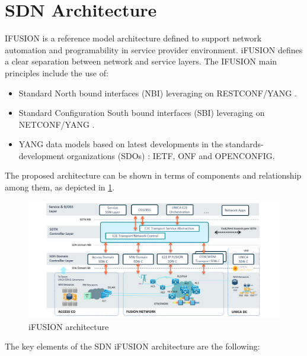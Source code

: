 \documentclass[a4paper,fleqn]{cas-dc}
\begin{document}
\section{SDN Architecture}
\label{section:arq}

\uppercase{iFUSION} is a reference model architecture defined to support network automation and programability in service provider environment. iFUSION defines a clear separation between network and service layers.  The \uppercase{iFUSION} main principles include the use of:
\begin{itemize}
    \item Standard North bound interfaces (NBI) leveraging on \uppercase{RESTconf/YANG} \cite{bierman2017restconf}.
    \item Standard Configuration South bound interfaces (SBI) leveraging on \uppercase{NETCONF/YANG} \cite{enns2011network}.
    \item YANG data models based on latest developments in the standards-development organizations (SDOs) \cite{bjorklund2016yang}: \uppercase{IETF}, \uppercase{ONF} and \uppercase{OpenConfig}.
\end{itemize}

The proposed architecture can be shown in terms of components and relationship among them, as depicted in \cref{FIG:1}. 

\begin{figure}
	\centering
		\includegraphics[width=\linewidth]{figs/ifusion_architecture.png}
	\caption{iFUSION architecture}
	\label{FIG:1}
\end{figure}

The key elements of the SDN iFUSION architecture are the following:
\end{document}
